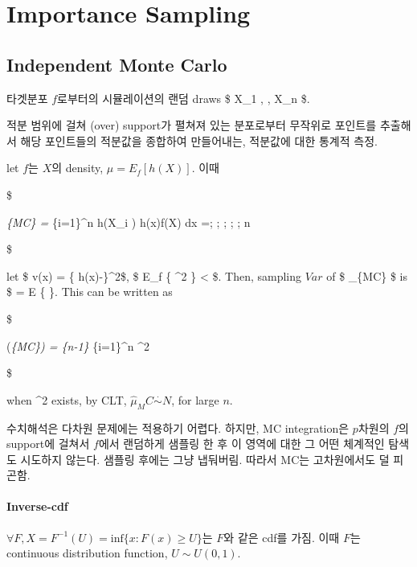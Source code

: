 \documentclass[
]{book}
\begin{document}
\hypertarget{importance-sampling}{%
\section{Importance Sampling}\label{importance-sampling}}

\hypertarget{independent-monte-carlo}{%
\subsection{Independent Monte Carlo}\label{independent-monte-carlo}}

타겟분포 \(f\)로부터의 시뮬레이션의 랜덤 draws \$ \pmb X\_1 , \cdots, \pmb X\_n \$.

적분 범위에 걸쳐 (over) support가 펼쳐져 있는 분포로부터 무작위로 포인트를 추출해서 해당 포인트들의 적분값을 종합하여 만들어내는, 적분값에 대한 통계적 측정.

let \(f\)는 \(X\)의 density, \(\mu = E_f \left[ h(X) \right]\). 이때

\$

\hat \mu\emph{\{MC\} =  \sum}\{i=1\}\^{}n h(X\_i ) \rightarrow \int h(x)f(X) dx =\mu ; ; ; ; ;  n \rightarrow \infty

\$

let \$ v(x) = \{ h(x)-\mu \}\^{}2\$, \$ E\_f \{ \left[ h(X) \right]\^{}2 \} \textless{} \infty \$. Then, sampling \(Var\) of \$ \hat \mu\_\{MC\} \$ is \$ = E \{  \}. This can be written as

\$

 (\hat \mu\emph{\{MC\}) =  \{n-1\} \sum}\{i=1\}\^{}n \^{}2

\$

when \sigma\^{}2 exists, by CLT, \(\hat \mu_MC \overset {\cdot} {\sim} N\), for large \(n\).

수치해석은 다차원 문제에는 적용하기 어렵다. 하지만, MC integration은 \(p\)차원의 \(f\)의 support에 걸쳐서 \(f\)에서 랜덤하게 샘플링 한 후 이 영역에 대한 그 어떤 체계적인 탐색도 시도하지 않는다. 샘플링 후에는 그냥 냅둬버림. 따라서 MC는 고차원에서도 덜 피곤함.

\hypertarget{inverse-cdf}{%
\paragraph{Inverse-cdf}\label{inverse-cdf}}

\(\forall F, X=F^{-1}(U) = \text{inf}\{ x:F(x) \ge U \}\)는 \(F\)와 같은 cdf를 가짐. 이때 \(F\)는 continuous distribution function, \(U \sim U(0, 1)\).
\end{document}
